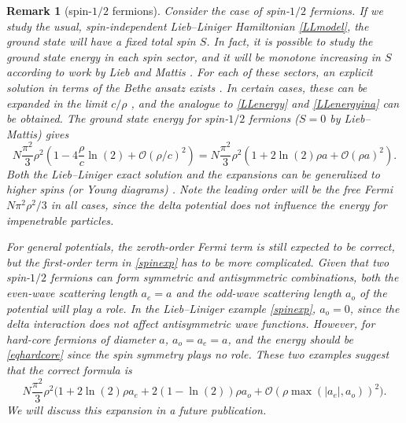 \documentclass[a4paper,11pt]{article}
\newtheorem{remark}[theorem]{Remark}
\numberwithin{equation}{section}
\begin{document}
\begin{remark}[spin-$1/2$ fermions]
 Consider the case of spin-$1/2$ fermions. If we study the usual, spin-independent Lieb--Liniger Hamiltonian \eqref{LLmodel}, the ground state will have a fixed total spin $S$. In fact, it is possible to study the ground state energy in each spin sector, and it will be monotone increasing in $S$ according to work by Lieb and Mattis \cite{lieb1962theory}. For each of these sectors, an explicit solution in terms of the Bethe ansatz exists \cite{yang1967some,gaudin1967systeme}. In certain cases, these can be expanded in the limit $c/\rho$ \cite{guan2011analytical}, and the analogue to \eqref{LLenergy} and \eqref{LLenergyina} can be obtained. The ground state energy for spin-$1/2$ fermions ($S=0$ by Lieb--Mattis) gives \cite{girardeau2006ground,guan2011analytical}
\begin{equation}
\label{spinexp}
N\frac{\pi^2}{3}\rho^2\left(1-4\frac{\rho}{c}\ln(2)+\mathcal{O}(\rho/c)^2\right)=N\frac{\pi^2}{3}\rho^2\left(1+2\ln(2)\rho a+\mathcal{O}(\rho a)^2\right).
\end{equation}
Both the Lieb--Liniger exact solution and the expansions can be generalized to higher spins (or Young diagrams) \cite{sutherland1968further,guan2012one}. Note the leading order will be the free Fermi $N\pi^2\rho^2/3$ in all cases, since the delta potential does not influence the energy for impenetrable particles.

For general potentials, the zeroth-order Fermi term is still expected to be correct, but the first-order term in \eqref{spinexp} has to be more complicated. Given that two spin-$1/2$ fermions can form symmetric and antisymmetric combinations, both the even-wave scattering length $a_e=a$ and the odd-wave scattering length $a_o$ of the potential will play a role. In the Lieb--Liniger example \eqref{spinexp}, $a_o=0$, since the delta interaction does not affect antisymmetric wave functions. However, for hard-core fermions of diameter $a$, $a_o=a_e=a$, and the energy should be \eqref{eqhardcore} since the spin symmetry plays no role. These two examples suggest that the correct formula is
\begin{equation}
N\frac{\pi^2}{3}\rho^2\big(1+2\ln(2)\rho a_e+2(1-\ln(2))\rho a_o+\mathcal{O}(\rho \max(|a_e|,a_o))^2\big).  
\end{equation}
We will discuss this expansion in a future publication.
\end{remark}
\end{document}

